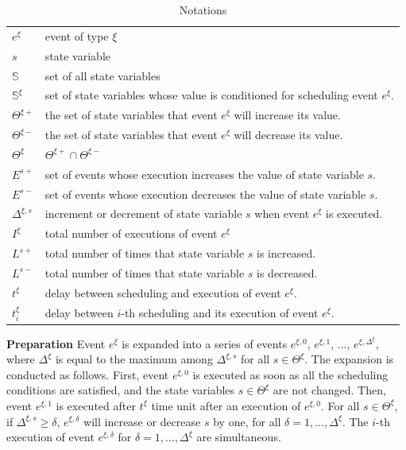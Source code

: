 \documentclass[]{interact}
\theoremstyle{plain}%
\theoremstyle{definition}
\theoremstyle{remark}
\begin{document}
\begin{table}[h]
	\begin{tabular}{ll}
		$e^{\xi}$ & event of type $\xi$\\
		$s$& state variable\\
		$\mathbb{S}$& set of all state variables\\
		$\mathbb{S}^{\xi}$  & set of state variables whose value is conditioned for scheduling event $e^{\xi}$.\\
		$\Theta^{\xi+}$ & the set of state variables that event $e^{\xi}$ will increase its value.\\
		$\Theta^{\xi-}$ & the set of state variables that event $e^{\xi}$ will decrease its value.\\
		$\Theta^{\xi}$ & $\Theta^{\xi+}\cap\Theta^{\xi-}$\\
		$E^{s+}$ & set of events whose execution increases the value of state variable $s$.\\
		$E^{s-}$  & set of events whose execution decreases the value of state variable $s$.\\
		$\Delta^{\xi,s}$ & increment or decrement of state variable $s$ when event $e^{\xi}$ is executed.\\
		$I^{\xi}$ & total number of executions of event $e^{\xi}$\\
		$L^{s+}$& total number of  times that state variable $s$ is increased.\\
		$L^{s-}$ & total number of  times that state variable $s$ is decreased.\\
		$t^{\xi}$ & delay between scheduling and execution of event $e^{\xi}$.\\
		$t^{\xi}_i$ & delay between $i$-th scheduling and its execution of event $e^{\xi}$.\\
	\end{tabular}
\caption{Notations}
\end{table}


\textbf{Preparation} Event $e^{\xi}$ is expanded into a series of events $e^{\xi,0}$, $e^{\xi,1}$, ..., $e^{\xi,\Delta^{\xi}}$, where $\Delta^{\xi}$ is equal to the maximum among $\Delta^{\xi,s}$ for all $s\in \Theta^{\xi}$. The expansion is conducted as follows. First, event $e^{\xi,0}$ is executed as soon as all the scheduling conditions are satisfied, and the state variables $s\in \Theta^{\xi}$ are not changed. Then, event $e^{\xi,1}$ is executed after $t^{\xi}$ time unit after an execution of $e^{\xi,0}$. For all $s\in \Theta^{\xi}$, if $\Delta^{\xi,s}\ge \delta$,  $e^{\xi,\delta}$ will increase or decrease $s$ by one, for all $\delta=1,...,\Delta^{\xi}$. The $i$-th execution of event $e^{\xi,\delta}$ for $\delta=1,...,\Delta^{\xi}$ are simultaneous.
\end{document}
